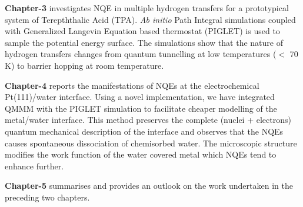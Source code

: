 \noindent \textbf{Chapter-3} investigates NQE in multiple hydrogen transfers for a prototypical system of Terepththalic Acid (TPA). \textit{Ab initio} Path Integral simulations coupled with Generalized Langevin Equation based thermostat (PIGLET) is used to sample the potential energy surface. The simulations show that the nature of hydrogen transfers changes from quantum tunnelling at low temperatures ($<$ 70 K) to barrier hopping at room temperature. 

\noindent \textbf{Chapter-4} reports the manifestations of NQEs at the electrochemical Pt(111)/water interface. Using a novel implementation, we have integrated QMMM with the PIGLET simulation to facilitate cheaper modelling of the metal/water interface. This method preserves the complete (nuclei + electrons) quantum mechanical description of the interface and observes that the NQEs causes spontaneous dissociation of chemisorbed water. The microscopic structure modifies the work function of the water covered metal which NQEs tend to enhance further.

\noindent \textbf{Chapter-5} summarises and provides an outlook on the work undertaken in the preceding two chapters.    
   

